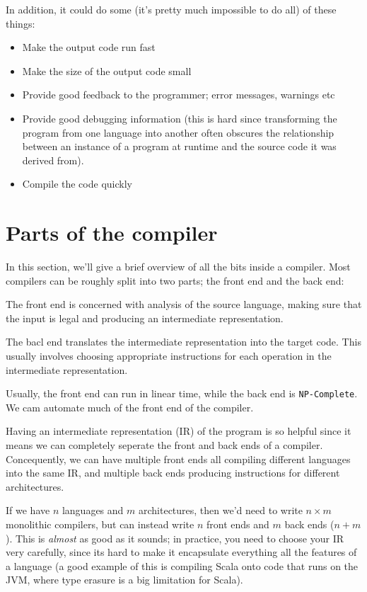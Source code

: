 In addition, it could do some (it's pretty much impossible to do all) of these
things:

\begin{itemize}
  \item Make the output code run fast
  \item Make the size of the output code small
  \item Provide good feedback to the programmer; error messages, warnings etc
  \item Provide good debugging information (this is hard since transforming the
  program from one language into another often obscures the relationship between
  an instance of a program at runtime and the source code it was derived from).
  \item Compile the code quickly
\end{itemize}

\section{Parts of the compiler}

In this section, we'll give a brief overview of all the bits inside a compiler.
Most compilers can be roughly split into two parts; the front end and the back
end:

\begin{description}
  \item The front end is concerned with analysis of the source language, making
  sure that the input is legal and producing an intermediate representation.
  \item The bacl end translates the intermediate representation into the target
  code. This usually involves choosing appropriate instructions for each 
  operation in the intermediate representation.
\end{description}

Usually, the front end can run in linear time, while the back end is
\texttt{NP-Complete}. We cam automate much of the front end of the compiler.

Having an intermediate representation (IR) of the program is so helpful since it
means we can completely seperate the front and back ends of a compiler.
Concequently, we can have multiple front ends all compiling different languages
into the same IR, and multiple back ends producing instructions for different
architectures.

If we have $n$ languages and $m$ architectures, then we'd need to write $n
\times m$ monolithic compilers, but can instead write $n$ front ends and $m$
back ends ($n+ m$). This is \textit{almost} as good as it sounds; in practice,
you need to choose your IR very carefully, since its hard to make it encapsulate
everything all the features of a language (a good example of this is compiling
Scala onto code that runs on the JVM, where type erasure is a big limitation for
Scala).

